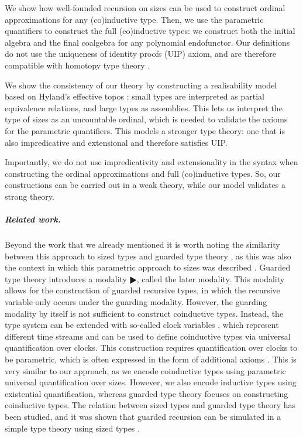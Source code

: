 We show how well-founded recursion on sizes can be used to construct ordinal approximations for any (co)inductive type.
Then, we use the parametric quantifiers to construct the full (co)inductive types: we construct both the initial algebra and the final coalgebra for any polynomial endofunctor.
Our definitions do not use the uniqueness of identity proofs (UIP) axiom, and are therefore compatible with homotopy type theory \cite{hottbook}.

We show the consistency of our theory by constructing a realisability model based on Hyland's effective topos \cite{hyland_effective_1982}: small types are interpreted as partial equivalence relations, and large types as assemblies.
This lets us interpret the type of sizes as an uncountable ordinal, which is needed to validate the axioms for the parametric quantifiers.
This models a stronger type theory: one that is also impredicative and extensional and therefore satisfies UIP.

Importantly, we do not use impredicativity and extensionality in the syntax when constructing the ordinal approximations and full (co)inductive types.
So, our constructions can be carried out in a weak theory, while our model validates a strong theory.

\subparagraph*{Related work.}
Beyond the work that we already mentioned it is worth noting the similarity between this approach to sized types and guarded type theory \cite{nakano}, as this was also the context in which this parametric approach to sizes was described \cite{licentiate}.
Guarded type theory introduces a modality $\RHD$, called the later modality.
This modality allows for the construction of guarded recursive types, in which the recursive variable only occurs under the guarding modality.
However, the guarding modality by itself is not sufficient to construct coinductive types.
Instead, the type system can be extended with so-called clock variables \cite{prod-coprogramming}, which represent different time streams and can be used to define coinductive types via universal quantification over clocks.
This construction requires quantification over clocks to be parametric, which is often expressed in the form of additional axioms \cite{mogelberg,guardedtypes16}.
This is very similar to our approach, as we encode coinductive types using parametric universal quantification over sizes. 
However, we also encode inductive types using existential quantification, whereas guarded type theory focuses on constructing coinductive types.
The relation between sized types and guarded type theory has been studied, and it was shown that guarded recursion can be simulated in a simple type theory using sized types \cite{guarded-via-sized}.

